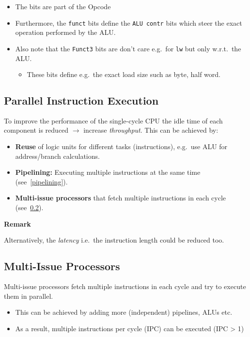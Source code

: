 \newpar{}
\begin{itemize}
    \item The  bits are part of the Opcode
    \item Furthermore, the \texttt{funct} bits define the \texttt{ALU contr} bits which steer the exact operation performed by the ALU.
    \item Also note that the \texttt{Funct3} bits are don't care e.g.\ for \texttt{lw} but only w.r.t.\ the ALU.
          \begin{itemize}
              \item These bits define e.g.\ the exact load size such as byte, half word.
          \end{itemize}
\end{itemize}

\subsection{Parallel Instruction Execution}

To improve the performance of the single-cycle CPU the idle time of each component is reduced  $\to$ increase \textit{throughput}. This can be achieved by:

\begin{itemize}
    \item \textbf{Reuse} of logic units for different tasks (instructions), e.g.\ use ALU for address/branch calculations.
    \item \textbf{Pipelining:} Executing multiple instructions at the same time (see~\ref{pipelining}).
    \item \textbf{Multi-issue processors} that fetch multiple instructions in each cycle (see~\ref{multi-issue processors}).
\end{itemize}

\textbf{Remark}

Alternatively, the \textit{latency} i.e.\ the instruction length could be reduced too.

\subsection{Multi-Issue Processors}\label{multi-issue processors}
Multi-issue processors fetch multiple instructions in each cycle and try to execute them in parallel.
\begin{itemize}
    \item This can be achieved by adding more (independent) pipelines, ALUs etc.
    \item As a result, multiple instructions per cycle (IPC) can be executed (IPC > 1)
\end{itemize}
